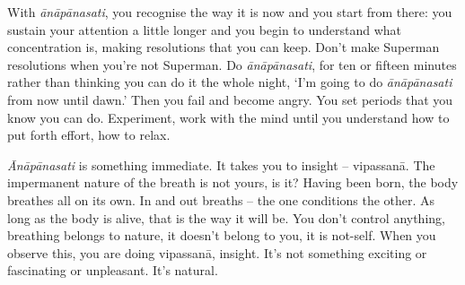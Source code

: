 With \textit{ānāpānasati}, you recognise the way it is now and you start from there: you sustain your attention a little longer and you begin to understand what concentration is, making resolutions that you can keep. Don't make Superman resolutions when you're not Superman. Do \textit{ānāpānasati}, for ten or fifteen minutes rather than thinking you can do it the whole night, `I'm going to do \textit{ānāpānasati} from now until dawn.' Then you fail and become angry. You set periods that you know you can do. Experiment, work with the mind until you understand how to put forth effort, how to relax.

\textit{Ānāpānasati} is something immediate. It takes you to insight -- vipassanā. The impermanent nature of the breath is not yours, is it? Having been born, the body breathes all on its own. In and out breaths -- the one conditions the other. As long as the body is alive, that is the way it will be. You don't control anything, breathing belongs to nature, it doesn't belong to you, it is not-self. When you observe this, you are doing vipassanā, insight. It's not something exciting or fascinating or unpleasant. It's natural.

